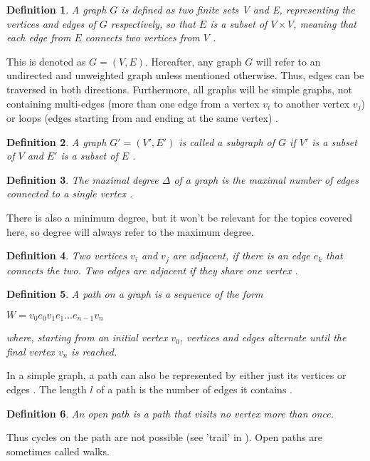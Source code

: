 \documentclass[12pt,a4paper]{article}
\newtheorem{definition}{Definition}
\begin{document}
\begin{definition}
A graph $G$ is defined as two finite sets V and E, representing the vertices and edges of $G$ respectively, so that $E$ is a subset of $ V \times V$, meaning that each edge from $E$ connects two vertices from $V$ \citep[p. 1]{Bollobas1998}.
\end{definition} 
This is denoted as $G = (V, E)$. Hereafter, any graph $G$ will refer to an undirected and unweighted graph unless mentioned otherwise. Thus, edges can be traversed in both directions. Furthermore, all graphs will be simple graphs, not containing multi-edges (more than one edge from a vertex $v_i$ to another vertex $v_j$) or loops (edges starting from and ending at the same vertex) \citep[pp. 3-4]{Gross2013}. 
\begin{definition}
A graph $G' = (V', E')$ is called a subgraph of $G$ if $V'$ is a subset of $V$ and $E'$ is a subset of $E$ \citep[p. 2]{Bollobas1998}.
\end{definition}
\begin{definition}
The maximal degree $\Delta$ of a graph is the maximal number of edges connected to a single vertex \citep[p. 4]{Bollobas1998}.
\end{definition}
There is also a minimum degree, but it won't be relevant for the topics covered here, so degree will always refer to the maximum degree.
\begin{definition}
Two vertices $v_i$ and $v_j$ are \textit{adjacent}, if there is an edge $e_k$ that connects the two. Two edges are adjacent if they share one vertex \citep[p. 1-2]{Bollobas1998}. 
\end{definition}
\begin{definition}
A path on a graph is a sequence of the form 
\begin{center}
	$ W = v_0 e_0 v_1 e_1...e_{n-1} v_n $
\end{center}
where, starting from an initial vertex $v_0$, vertices and edges alternate until the final vertex $v_n$ is reached.
\end{definition}
In a simple graph, a path can also be represented by either just its vertices \citep[p. 10]{Gross2013} or edges \citep[p. 4]{Bollobas1998}. The length $l$ of a path is the number of edges it contains \citep[p. 5]{Bollobas1998}.
\newpage
\begin{definition}
An open path is a path that visits no vertex more than once.
\end{definition} Thus cycles on the path are not possible (see 'trail' in \citep[p. 10]{Gross2013}). Open paths are sometimes called walks. 
\end{document}
